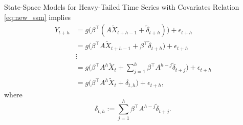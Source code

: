 \documentclass{beamer}
\begin{document}

\begin{frame}{State-Space Models for Heavy-Tailed Time Series with Covariates}
    Relation \eqref{eq:new_ssm} implies
    \begin{align*}
        Y_{t+h} &= g \Big( \beta^\top ( A \tilde X_{t+h-1} + \tilde  \delta_{t+h})\Big ) + \epsilon_{t+h} \\
        &= g \Big( \beta^\top A \tilde X_{t + h-1} +  \beta^\top \tilde  \delta_{t+h}  \Big) + \epsilon_{t+h} \\
        &\vdots \\
        &= g \Big( \beta^\top A^h \tilde X_t + \sum_{j=1}^h \beta^\top A^{h - j}\tilde  \delta_{t+j}  \Big) +  \epsilon_{t+h} \\
        &= g \Big( \beta^\top A^h \tilde X_t + \delta_{t,h} \Big) + \epsilon_{t+h},
    \end{align*}
    where 
    \begin{equation*}
    \delta_{t,h}:= \sum_{j=1}^h \beta^\top A^{h - j}\tilde  \delta_{t+j}.
    \end{equation*}
\end{frame}
\end{document}
